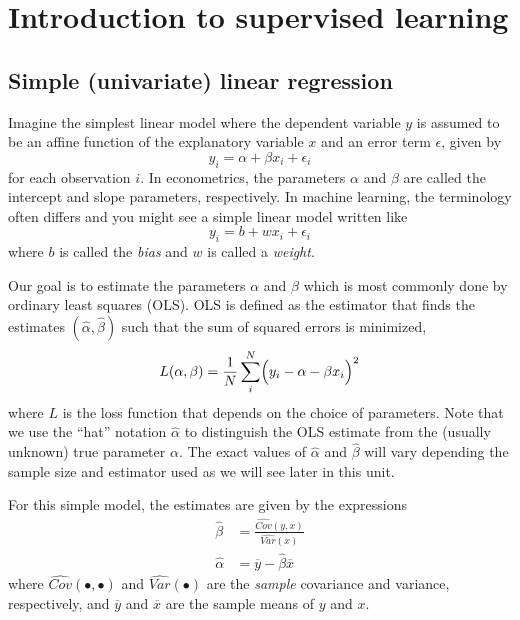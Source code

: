 \documentclass{scrartcl}
\begin{document}
    
    \maketitle
	\tableofcontents
    
    

    
    \hypertarget{introduction-to-supervised-learning}{%
\section{Introduction to supervised
learning}\label{introduction-to-supervised-learning}}

    \hypertarget{simple-univariate-linear-regression}{%
\subsection{Simple (univariate) linear
regression}\label{simple-univariate-linear-regression}}

Imagine the simplest linear model where the dependent variable \(y\) is
assumed to be an affine function of the explanatory variable \(x\) and
an error term \(\epsilon\), given by \[
y_i = \alpha + \beta x_i + \epsilon_i
\] for each observation \(i\). In econometrics, the parameters
\(\alpha\) and \(\beta\) are called the intercept and slope parameters,
respectively. In machine learning, the terminology often differs and you
might see a simple linear model written like \[
y_i = b + w x_i + \epsilon_i
\] where \(b\) is called the \emph{bias} and \(w\) is called a
\emph{weight}.

Our goal is to estimate the parameters \(\alpha\) and \(\beta\) which is
most commonly done by ordinary least squares (OLS). OLS is defined as
the estimator that finds the estimates
\((\widehat{\alpha}, \widehat{\beta})\) such that the sum of squared
errors is minimized, \[
L(\alpha, \beta) = \frac{1}{N}
    \sum_i^N \Bigl(y_i - \alpha - \beta x_i \Bigr)^2
\] where \(L\) is the loss function that depends on the choice of
parameters. Note that we use the ``hat'' notation \(\widehat{\alpha}\)
to distinguish the OLS estimate from the (usually unknown) true
parameter \(\alpha\). The exact values of \(\widehat{\alpha}\) and
\(\widehat{\beta}\) will vary depending the sample size and estimator
used as we will see later in this unit.

For this simple model, the estimates are given by the expressions \[
\begin{aligned}
\widehat{\beta} &= \frac{\widehat{Cov}(y,x)}{\widehat{Var}(x)} \\
\widehat{\alpha} &= \overline{y} - \widehat{\beta} \overline{x}
\end{aligned}
\] where \(\widehat{Cov}(\bullet,\bullet)\) and
\(\widehat{Var}(\bullet)\) are the \emph{sample} covariance and
variance, respectively, and \(\overline{y}\) and \(\overline{x}\) are
the sample means of \(y\) and \(x\).
\end{document}
